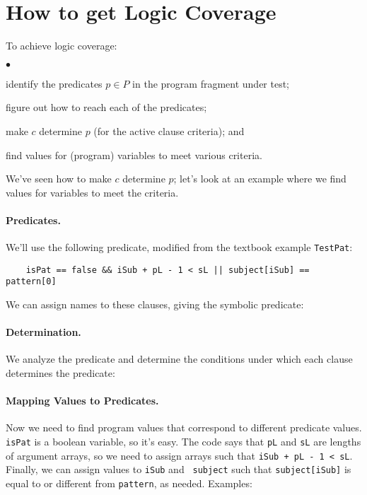 \documentclass[11pt]{article}
\newcommand{\squishlist}{
 \begin{list}{$\bullet$}
  { \setlength{\itemsep}{0pt}
     \setlength{\parsep}{3pt}
     \setlength{\topsep}{3pt}
     \setlength{\partopsep}{0pt}
     \setlength{\leftmargin}{1.5em}
     \setlength{\labelwidth}{1em}
     \setlength{\labelsep}{0.5em} } }
\newcommand{\squishend}{
  \end{list}  }
\begin{document}
\section*{How to get Logic Coverage}
To achieve logic coverage:
\squishlist
\item identify the predicates $p \in P$ in the program fragment under test;
\item figure out how to reach each of the predicates;
\item make $c$ determine $p$ (for the active clause criteria); and
\item find values for (program) variables to meet various criteria.
\squishend

We've seen how to make $c$ determine $p$; let's look at an example where
we find values for variables to meet the criteria.

\paragraph{Predicates.} We'll use the following predicate, modified from the textbook example
{\tt TestPat}:
\begin{verbatim}
    isPat == false && iSub + pL - 1 < sL || subject[iSub] == pattern[0]
\end{verbatim}
We can assign names to these clauses, giving the symbolic predicate:\\[1em]

\paragraph{Determination.} We analyze the predicate and determine the conditions under which each clause
determines the predicate: \\[3em]

\paragraph{Mapping Values to Predicates.} Now we need to find program values that correspond to different
predicate values. {\tt isPat} is a boolean variable, so it's easy. The
code says that {\tt pL} and {\tt sL} are lengths of argument arrays,
so we need to assign arrays such that {\tt iSub + pL - 1 < sL}.
Finally, we can assign values to {\tt iSub} and {\tt
  subject} such that {\tt subject[iSub]} is equal to or different from
{\tt pattern}, as needed. Examples:\\[3em]
\end{document}
